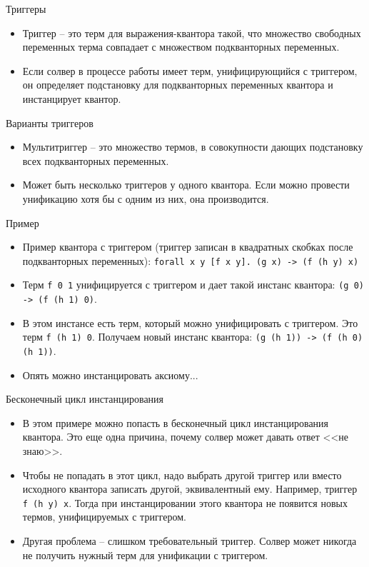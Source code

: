 \documentclass[hyperref={unicode=true}]{beamer}
\begin{document}
    \begin{frame}{Триггеры}
    \begin{itemize}
    \item
    Триггер -- это терм для выражения-квантора такой, что множество
    свободных переменных терма совпадает с множеством подкванторных переменных.
    \item
    Если солвер в процессе работы имеет терм, унифицирующийся с триггером,
    он определяет подстановку для подкванторных переменных квантора и
    инстанцирует квантор.
    \end{itemize}
    \end{frame}

    \begin{frame}{Варианты триггеров}
    \begin{itemize}
    \item
    Мультитриггер -- это множество термов, в совокупности дающих подстановку
    всех подкванторных переменных.
    \item
    Может быть несколько триггеров у одного квантора. Если можно провести
    унификацию хотя бы с одним из них, она производится.
    \end{itemize}
    \end{frame}

    \begin{frame}{Пример}
    \begin{itemize}
    \item
    Пример квантора с триггером (триггер записан в
            квадратных скобках после подкванторных переменных):
        \texttt{forall x y [f x y]. (g x) -> (f (h y) x)}
    \item
    Терм \texttt{f 0 1} унифицируется с триггером и дает такой
    инстанс квантора: \texttt{(g 0) -> (f (h 1) 0)}.
    \item
    В этом инстансе есть терм, который можно унифицировать с триггером.
    Это терм \texttt{f (h 1) 0}. Получаем новый инстанс квантора:
    \texttt{(g (h 1)) -> (f (h 0) (h 1))}.
    \item
    Опять можно инстанцировать аксиому...
    \end{itemize}
    \end{frame}

    \begin{frame}{Бесконечный цикл инстанцирования}
    \begin{itemize}
    \item
    В этом примере можно попасть в бесконечный цикл инстанцирования квантора.
    Это еще одна причина, почему солвер может давать ответ <<не знаю>>.
    \item
    Чтобы не попадать в этот цикл, надо выбрать другой триггер
    или вместо исходного квантора записать другой, эквивалентный ему. Например,
    триггер \texttt{f (h y) x}. Тогда при инстанцировании этого квантора
    не появится новых термов, унифицируемых с триггером.
    \item
    Другая проблема -- слишком требовательный триггер. Солвер может никогда
    не получить нужный терм для унификации с триггером.
    \end{itemize}
    \end{frame}
\end{document}
